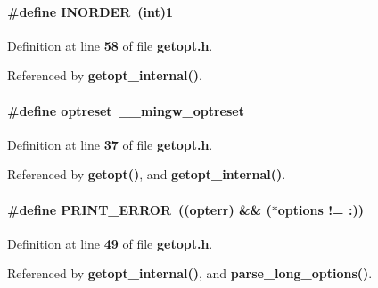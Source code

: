 \paragraph[{I\+N\+O\+R\+D\+ER}]{\setlength{\rightskip}{0pt plus 5cm}\#define I\+N\+O\+R\+D\+ER~({\bf int})1}\label{soapysdr_2apps_2msvc_2getopt_8h_ab043c5480fc290137f7fe7fb33ce6141}


Definition at line {\bf 58} of file {\bf getopt.\+h}.



Referenced by {\bf getopt\+\_\+internal()}.

\paragraph[{optreset}]{\setlength{\rightskip}{0pt plus 5cm}\#define optreset~{\bf \+\_\+\+\_\+mingw\+\_\+optreset}}\label{soapysdr_2apps_2msvc_2getopt_8h_ab95d1b25e0c8b7aa1c5c1b427d3c1c0a}


Definition at line {\bf 37} of file {\bf getopt.\+h}.



Referenced by {\bf getopt()}, and {\bf getopt\+\_\+internal()}.

\paragraph[{P\+R\+I\+N\+T\+\_\+\+E\+R\+R\+OR}]{\setlength{\rightskip}{0pt plus 5cm}\#define P\+R\+I\+N\+T\+\_\+\+E\+R\+R\+OR~(({\bf opterr}) \&\& ($\ast$options != \textquotesingle{}\+:\textquotesingle{}))}\label{soapysdr_2apps_2msvc_2getopt_8h_aa0004d1735f5c5a47cd385525c5bdbc0}


Definition at line {\bf 49} of file {\bf getopt.\+h}.



Referenced by {\bf getopt\+\_\+internal()}, and {\bf parse\+\_\+long\+\_\+options()}.


